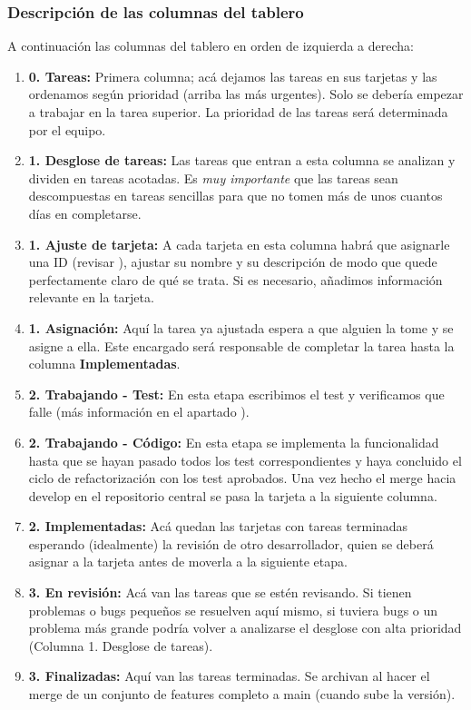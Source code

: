 \subsubsection{Descripción de las columnas del tablero}\label{flujo:descripcion-de-columnas}
A continuación las columnas del tablero en orden de izquierda a derecha:

\begin{enumerate}
	\item \textbf{0. Tareas:} Primera columna; acá dejamos las tareas en sus tarjetas y las ordenamos según prioridad (arriba las más urgentes). Solo se debería empezar a trabajar en la tarea superior. La prioridad de las tareas será determinada por el equipo.
	
	\item \textbf{1. Desglose de tareas:} Las tareas que entran a esta columna se analizan y dividen en tareas acotadas. Es \textit{muy importante} que las tareas sean descompuestas en tareas sencillas para que no tomen más de unos cuantos días en completarse.
	
    \item \textbf{1. Ajuste de tarjeta:} A cada tarjeta en esta columna habrá que asignarle una ID (revisar ), ajustar su nombre y su descripción de modo que quede perfectamente claro de qué se trata. Si es necesario, añadimos información relevante en la tarjeta.

	\item \textbf{1. Asignación:} Aquí la tarea ya ajustada espera a que alguien la tome y se asigne a ella. Este encargado será responsable de completar la tarea hasta la columna \textbf{Implementadas}.
	
	\item \textbf{2. Trabajando - Test:} En esta etapa escribimos el test y verificamos que falle (más información en el apartado ).
	
	\item \textbf{2. Trabajando - Código:} En esta etapa se implementa la funcionalidad hasta que se hayan pasado todos los test correspondientes y haya concluido el ciclo de refactorización con los test aprobados. Una vez hecho el merge hacia develop en el repositorio central se pasa la tarjeta a la siguiente columna.
	
	\item \textbf{2. Implementadas:} Acá quedan las tarjetas con tareas terminadas esperando (idealmente) la revisión de otro desarrollador, quien se deberá asignar a la tarjeta antes de moverla a la siguiente etapa.
	
	\item \textbf{3. En revisión:} Acá van las tareas que se estén revisando. Si tienen problemas o bugs pequeños se resuelven aquí mismo, si tuviera bugs o un problema más grande podría volver a analizarse el desglose con alta prioridad (Columna 1. Desglose de tareas).
	
	\item \textbf{3. Finalizadas:} Aquí van las tareas terminadas. Se archivan al hacer el merge de un conjunto de features completo a main (cuando sube la versión).
\end{enumerate}

